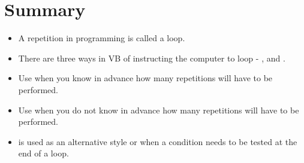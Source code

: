 	\section{Summary}
		\begin{itemize}
	    \item A repetition in programming is called a loop.
  	  \item There are three ways in VB of instructing the computer to loop - ,  and .
    	\item Use  when you know in advance how many repetitions will have to be performed.
	    \item Use  when you do not know in advance how many repetitions will have to be performed.
  	  \item {} is used as an alternative style or when a condition needs to be tested at the end of a loop.
		\end{itemize}


